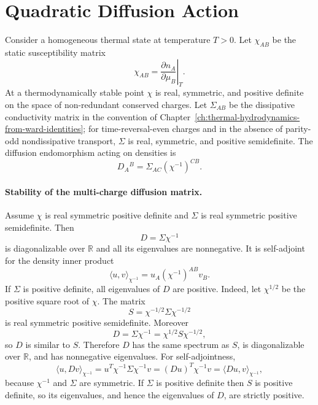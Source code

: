 \section{Quadratic Diffusion Action}

Consider a homogeneous thermal state at temperature \(T>0\).  Let
\(\chi_{AB}\) be the static susceptibility matrix
\[
  \chi_{AB}=\left.{\frac{\partial n_A}{\partial\mu_B}}\right|_T .
\]
At a thermodynamically stable point \(\chi\) is real, symmetric, and
positive definite on the space of non-redundant conserved charges.  Let
\(\Sigma_{AB}\) be the dissipative conductivity matrix in the convention of
Chapter~\ref{ch:thermal-hydrodynamics-from-ward-identities}; for
time-reversal-even charges and in the absence of parity-odd nondissipative
transport, \(\Sigma\) is real, symmetric, and positive semidefinite.  The
diffusion endomorphism acting on densities is
\begin{equation}
  D_A{}^B=\Sigma_{AC}(\chi^{-1})^{CB}.
  \label{eq:sk-hydro-diffusion-matrix}
\end{equation}

\paragraph{Stability of the multi-charge diffusion matrix.}
Assume \(\chi\) is real symmetric positive definite and \(\Sigma\) is real
symmetric positive semidefinite.  Then
\begin{equation}
  D=\Sigma\chi^{-1}
  \label{eq:sk-hydro-diffusion-endomorphism-matrix}
\end{equation}
is diagonalizable over \(\mathbb R\) and all its eigenvalues are
nonnegative.  It is self-adjoint for the density inner product
\begin{equation}
  \langle u,v\rangle_{\chi^{-1}}
  =
  u_A(\chi^{-1})^{AB}v_B .
  \label{eq:sk-hydro-density-inner-product}
\end{equation}
If \(\Sigma\) is positive definite, all eigenvalues of \(D\) are positive.
Indeed, let \(\chi^{1/2}\) be the positive square root of \(\chi\).  The matrix
\begin{equation}
  S=\chi^{-1/2}\Sigma\chi^{-1/2}
  \label{eq:sk-hydro-symmetric-diffusion-similarity}
\end{equation}
is real symmetric positive semidefinite.  Moreover
\begin{equation}
  D=\Sigma\chi^{-1}
  =
  \chi^{1/2}S\chi^{-1/2},
  \label{eq:sk-hydro-diffusion-similar-to-symmetric}
\end{equation}
so \(D\) is similar to \(S\).  Therefore \(D\) has the same spectrum as
\(S\), is diagonalizable over \(\mathbb R\), and has nonnegative
eigenvalues.  For self-adjointness,
\begin{equation}
  \langle u,Dv\rangle_{\chi^{-1}}
  =
  u^T\chi^{-1}\Sigma\chi^{-1}v
  =
  (Du)^T\chi^{-1}v
  =
  \langle Du,v\rangle_{\chi^{-1}},
  \label{eq:sk-hydro-diffusion-self-adjoint-proof}
\end{equation}
because \(\chi^{-1}\) and \(\Sigma\) are symmetric.  If \(\Sigma\) is
positive definite then \(S\) is positive definite, so its eigenvalues, and
hence the eigenvalues of \(D\), are strictly positive.

